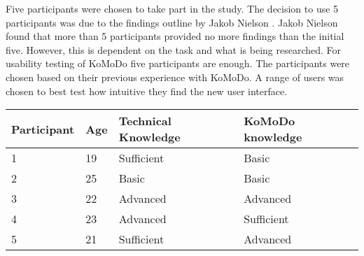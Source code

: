 %
Five participants were chosen to take part in the study. The decision to use 5 participants was due to the findings outline by Jakob Nielson \cite{usability_engineer}. Jakob Nielson found that more than 5 participants provided no more findings than the initial five. However, this is dependent on the task and what is being researched. For usability testing of KoMoDo five participants are enough.
%
The participants were chosen based on their previous experience with KoMoDo. A range of users was chosen to best test how intuitive they find the new user interface.
\begin{center}
\begin{tabular}{| l |  p{1cm} | p{4cm} | p{4cm} | }
		\hline
		Participant & Age & Technical Knowledge & KoMoDo knowledge \\ \hline
		1 & 19 & Sufficient & Basic \\ \hline
		2 & 25 & Basic & Basic \\ \hline
		3 & 22 & Advanced & Advanced \\ \hline
		4 & 23 & Advanced & Sufficient \\ \hline
		5 & 21 & Sufficient & Advanced \\ \hline
\end{tabular}
\end{center}

